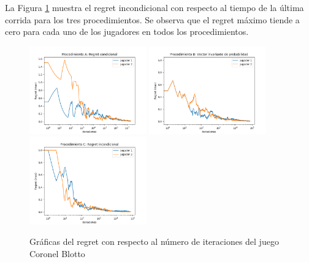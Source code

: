  La Figura \ref{fig:regret-coronel-blotto} muestra el regret incondicional con respecto al tiempo de la última corrida para los tres procedimientos. Se observa que el regret máximo tiende a cero para cada uno de los jugadores en todos los procedimientos.
 
\begin{figure}[hbt!]
\caption{Gráficas del regret con respecto al número de iteraciones del juego Coronel Blotto}
\label{fig:regret-coronel-blotto}
\centering
\includegraphics[width=0.45\textwidth]{graficas/coronel-blotto/procedimiento-A.png}
\includegraphics[width=0.45\textwidth]{graficas/coronel-blotto/procedimiento-B.png}
\includegraphics[width=0.45\textwidth]{graficas/coronel-blotto/procedimiento-C.png}
\end{figure}
\newpage